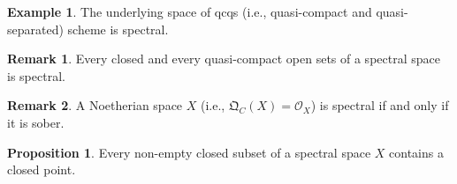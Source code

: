 \documentclass[10pt]{article}
\numberwithin{equation}{section}
\theoremstyle{definition}
\newtheorem{proposition}{Proposition}[subsection]
\newtheorem{remark}{Remark}[subsection]
\newtheorem{example}{Example}[subsection]
\newcommand{\Ouv}{\mathscr{O}}
\newcommand{\QC}[0]{\mathfrak{Q}_C}
\begin{document}
\begin{example}
    The underlying space of qcqs (i.e., quasi-compact and quasi-separated) scheme is spectral.
\end{example}
\begin{remark}
    \label{remark_example_1_b}
    Every closed and every quasi-compact open sets of a spectral space is spectral.
\end{remark}
\begin{remark}
    A Noetherian space $X$ (i.e., $\QC(X)=\Ouv_X$) is spectral if and only if it is sober.
\end{remark}
\begin{proposition}
    \label{fact_1_2_7}
    \label{proposition_1_2_7}
    Every non-empty closed subset of a spectral space $X$ contains a closed point.
\end{proposition}
\end{document}
